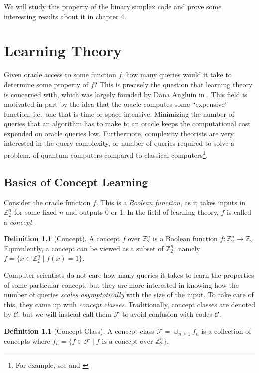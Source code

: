 \documentclass[12pt,twoside]{reedthesis}
\theoremstyle{definition}
\newtheorem{definition}[theorem]{Definition}
\newlength{\arrow}
\newcommand{\Z}{\mathbb{Z}}
\begin{document}
We will study this property of the binary simplex code and prove some interesting results about it in chapter 4.

\chapter{Learning Theory}

Given oracle  access to some function $f$, how many queries would it take to determine some property of $f$? This is precisely the question that learning theory is concerned with, which was largely founded by Dana Angluin in \citep{angluin1988queries}. This field is motivated in part by the idea that the oracle computes some ``expensive'' function, i.e.~one that is time or space intensive. Minimizing the number of queries that an algorithm has to make to an oracle keeps the computational cost expended on oracle queries low. Furthermore, complexity theorists are very interested in the query complexity, or number of queries required to solve a problem, of quantum computers compared to classical computers\footnote{For example, see \citep{gortler2001quantum} and \citep{atici2005improved}}.

\section{Basics of Concept Learning}
Consider the oracle function $f$. This is a \textit{Boolean function}, as it takes inputs in $\Z_2^n $ for some fixed $n$ and outputs 0 or 1. In the field of learning theory, $f$ is called a \textit{concept}.

\begin{definition}[Concept] A concept $f$ over $\Z_2^n$ is a Boolean function $f: \Z_2^n \rightarrow \Z_2$. Equivalently, a concept can be viewed as a subset of $\Z_2^n$, namely $f = \{x \in \Z_2^n \mid f(x) = 1\}$.
\end{definition}

Computer scientists do not care how many queries it takes to learn the properties of some particular concept, but they are more interested in knowing how the number of queries \textit{scales asymptotically} with the size of the input. To take care of this, they came up with 
\textit{concept classes}. Traditionally, concept classes are denoted by $\mathcal{C}$, but we will instead call them $\mathcal{F}$ to avoid confusion with codes $\mathscr{C}$. 

\begin{definition}[Concept Class] A concept class $\mathcal{F} = \cup_{n \geq 1} f_n$ is a collection of concepts where $f_n = \{f \in \mathcal{F} \mid f \text{ is a concept over } \Z_2^n\}$.
\end{definition}
\end{document}
